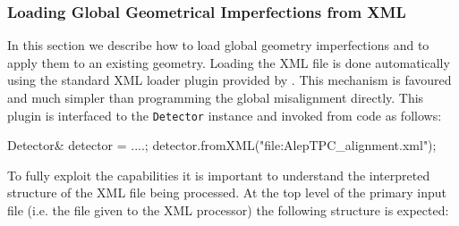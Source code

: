 \documentclass[10pt,a4paper]{article}
\begin{document}
\subsubsection{Loading Global Geometrical Imperfections from XML}
\label{sec:ddalign-user-manual-global-misalignment-manip-xml}
\noindent
In this section we describe how to load global geometry 
imperfections and to apply them
to an existing geometry. Loading the XML file is done automatically using the 
standard XML loader plugin provided by \DDhep. This mechanism is favoured and 
much simpler than programming the global misalignment directly.
This plugin is interfaced to 
the {\tt Detector} instance and invoked from code as follows:
\begin{code}
    Detector& detector = ....;
    detector.fromXML("file:AlepTPC_alignment.xml");
\end{code}
To fully exploit the capabilities it is important to understand the interpreted 
structure of the XML file being processed. At the top level of the primary 
input file (i.e. the file given to the XML processor) the following structure 
is expected:
\end{document}
